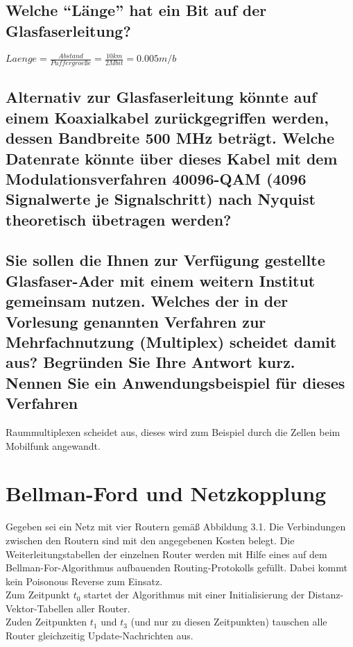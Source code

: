 \documentclass[a4paper]{article}
\begin{document}
\subsection{Welche ``Länge'' hat ein Bit auf der Glasfaserleitung?}
$Laenge = \frac{Abstand}{Puffergroeße} = \frac{10km}{2Mbit} = 0.005 m/b$
\subsection{Alternativ zur Glasfaserleitung könnte auf einem Koaxialkabel zurückgegriffen werden, dessen Bandbreite 500 MHz beträgt. Welche Datenrate könnte über dieses Kabel mit dem Modulationsverfahren 40096-QAM (4096 Signalwerte je Signalschritt) nach Nyquist theoretisch übetragen werden?}
\subsection{Sie sollen die Ihnen zur Verfügung gestellte Glasfaser-Ader mit einem weitern Institut gemeinsam nutzen. Welches der in der Vorlesung genannten Verfahren zur Mehrfachnutzung (Multiplex) scheidet damit aus? Begründen Sie Ihre Antwort kurz. Nennen Sie ein Anwendungsbeispiel für dieses Verfahren}
Raummultiplexen scheidet aus, dieses wird zum Beispiel durch die Zellen beim Mobilfunk angewandt.
\pagebreak
\section{Bellman-Ford und Netzkopplung}
Gegeben sei ein Netz mit vier Routern gemäß Abbildung 3.1. Die Verbindungen zwischen den Routern sind mit den angegebenen Kosten belegt. Die Weiterleitungstabellen der einzelnen Router werden mit Hilfe eines auf dem Bellman-For-Algorithmus aufbauenden Routing-Protokolls gefüllt. Dabei kommt kein Poisonous Reverse zum Einsatz.\\[0.5cm]
Zum Zeitpunkt $t_0$ startet der Algorithmus mit einer Initialisierung der Distanz-Vektor-Tabellen aller Router.\\[0.5cm]
Zuden Zeitpunkten $t_1$ und $t_3$
(und nur zu diesen Zeitpunkten) tauschen alle Router gleichzeitig Update-Nachrichten aus.
\begin{center}
\end{center}
\end{document}
